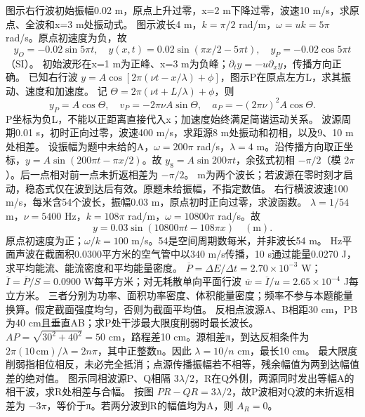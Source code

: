 \problemtext 图示右行波初始振幅0.02 m，原点上升过零，x=2 m下降过零，波速10 m/s，求原点、全波和x=3 m处振动式。
\workings 图示波长4 m，$k=\pi/2$ rad/m，$\omega=uk=5\pi$ rad/s。原点初速度为负，故
\[
y_O=-0.02\sin5\pi t,\quad
y(x,t)=0.02\sin(\pi x/2-5\pi t),\quad
y_P=-0.02\cos5\pi t
\]
（SI）。
\crosscheck 初始波形在x=1 m为正峰、x=3 m为负峰；$\partial_t y=-u\partial_x y$，传播方向正确。
\problemtext 已知右行波 $y=A\cos[2\pi(\nu t-x/\lambda)+\phi]$，图示P在原点左方L，求其振动、速度和加速度。
\workings 记 $\Theta=2\pi(\nu t+L/\lambda)+\phi$，则
\[
y_P=A\cos\Theta,\quad v_P=-2\pi\nu A\sin\Theta,\quad
a_P=-(2\pi\nu)^2A\cos\Theta.
\]
\crosscheck P坐标为负L，不能以正距离直接代入x；加速度始终满足简谐运动关系。
\problemtext 波源周期0.01 s，初时正向过零，波速400 m/s，求距源8 m处振动和初相，以及9、10 m处相差。
\workings 设振幅为题中未给的A，$\omega=200\pi$ rad/s，$\lambda=4$ m。沿传播方向取正坐标，$y=A\sin(200\pi t-\pi x/2)$。故 $y_8=A\sin200\pi t$，余弦式初相 $-\pi/2$（模 $2\pi$）。后一点相对前一点未折返相差为 $-\pi/2$。
 m为两个波长；若波源在零时刻才启动，稳态式仅在波到达后有效。原题未给振幅，不指定数值。
\problemtext 右行横波波速100 m/s，每米含54个波长，振幅0.03 m，原点初时正向过零，求波函数。
\workings $\lambda=1/54$ m，$\nu=5400$ Hz，$k=108\pi$ rad/m，$\omega=10800\pi$ rad/s。故
\[
y=0.03\sin(10800\pi t-108\pi x)\quad(\mathrm m).
\]
\crosscheck 原点初速度为正；$\omega/k=100$ m/s。54是空间周期数每米，并非波长54 m。
 Hz平面声波在截面积0.0300平方米的空气管中以340 m/s传播，10 s通过能量0.0270 J，求平均能流、能流密度和平均能量密度。
\workings $\overline P=\Delta E/\Delta t=2.70\times10^{-3}$ W；$\overline I=\overline P/S=0.0900$ W每平方米；对无耗散单向平面行波 $\overline w=\overline I/u=2.65\times10^{-4}$ J每立方米。
\crosscheck 三者分别为功率、面积功率密度、体积能量密度；频率不参与本题能量换算。假定截面强度均匀，否则为截面平均值。
\problemtext 反相点波源A、B相距30 cm，PB为40 cm且垂直AB；求P处干涉最大限度削弱时最长波长。
\workings $AP=\sqrt{30^2+40^2}=50$ cm，路程差10 cm。源相差π，到达反相条件为 $2\pi(10\,\mathrm{cm})/\lambda=2n\pi$，其中正整数n。因此 $\lambda=10/n$ cm，最长10 cm。
\crosscheck 最大限度削弱指相位相反，未必完全抵消；点源传播振幅若不相等，残余幅值为两到达幅值差的绝对值。
\problemtext 图示同相波源P、Q相隔 $3\lambda/2$，R在Q外侧，两源同时发出等幅A的相干波，求R处相差与合幅。
\workings 按图 $PR-QR=3\lambda/2$，故P波相对Q波的未折返相差为 $-3\pi$，等价于π。若两分波到R的幅值均为A，则 $A_R=0$。

